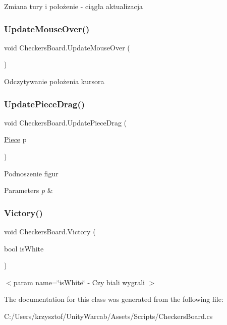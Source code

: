 Zmiana tury i położenie -\/ ciągła aktualizacja 

\mbox{\label{class_checkers_board_aa23396a0d7ea31dc496f4204b78fe1ba}} 
\subsubsection{\texorpdfstring{UpdateMouseOver()}{UpdateMouseOver()}}
{\footnotesize\ttfamily void Checkers\+Board.\+Update\+Mouse\+Over (\begin{DoxyParamCaption}{ }\end{DoxyParamCaption})\hspace{0.3cm}{\ttfamily [private]}}



Odczytywanie położenia kursora 

\mbox{\label{class_checkers_board_a0f4c37cf6ad7e2b7a275c926b1dd056d}} 
\subsubsection{\texorpdfstring{UpdatePieceDrag()}{UpdatePieceDrag()}}
{\footnotesize\ttfamily void Checkers\+Board.\+Update\+Piece\+Drag (\begin{DoxyParamCaption}\item[{\mbox{\hyperlink{class_piece}{Piece}}}]{p }\end{DoxyParamCaption})\hspace{0.3cm}{\ttfamily [private]}}



Podnoszenie figur 


\begin{DoxyParams}{Parameters}
{\em p} & \\
\hline
\end{DoxyParams}
\mbox{\label{class_checkers_board_aa4fb3184676cf22bd5958b6484e86c34}} 
\subsubsection{\texorpdfstring{Victory()}{Victory()}}
{\footnotesize\ttfamily void Checkers\+Board.\+Victory (\begin{DoxyParamCaption}\item[{bool}]{is\+White }\end{DoxyParamCaption})\hspace{0.3cm}{\ttfamily [private]}}





$<$param name=\char`\"{}is\+White\char`\"{} -\/ Czy biali wygrali $>$

The documentation for this class was generated from the following file\+:\begin{DoxyCompactItemize}
\item 
C\+:/\+Users/krzysztof/\+Unity\+Warcab/\+Assets/\+Scripts/Checkers\+Board.\+cs\end{DoxyCompactItemize}

